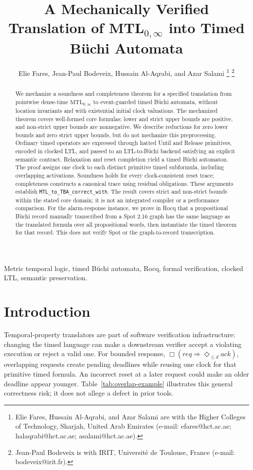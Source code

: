 \documentclass[10pt,journal,compsoc]{IEEEtran}
\title{A Mechanically Verified Translation of MTL$_{0,\infty}$ into Timed B\"uchi Automata}
\author{Elie Fares, Jean-Paul Bodeveix, Hussain Al-Aqrabi, and Azar Salami%
\thanks{Elie Fares, Hussain Al-Aqrabi, and Azar Salami are with the Higher Colleges of Technology, Sharjah, United Arab Emirates (e-mail: efares@hct.ac.ae; halaqrabi@hct.ac.ae; asalami@hct.ac.ae).}%
\thanks{Jean-Paul Bodeveix is with IRIT, Universit\'e de Toulouse, France (e-mail: bodeveix@irit.fr).}%
}
\begin{document}
\maketitle

\begin{abstract}
We mechanize a soundness and completeness theorem for a specified translation
from pointwise dense-time $\mathrm{MTL}_{0,\infty}$ to event-guarded timed
B\"uchi automata, without location invariants and with existential initial
clock valuations. The
mechanized theorem covers well-formed core formulas: lower and strict upper
bounds are positive, and non-strict upper bounds are nonnegative. We describe
reductions for zero lower bounds and zero strict upper bounds, but do not
mechanize this preprocessing. Ordinary timed operators are expressed through
hatted Until and Release primitives, encoded in clocked LTL, and passed to an
LTL-to-B\"uchi backend satisfying an explicit semantic contract. Relaxation
and reset completion yield a timed B\"uchi automaton. The proof assigns one
clock to each distinct primitive timed subformula, including overlapping
activations. Soundness holds for every clock-consistent reset trace;
completeness constructs a canonical trace using residual obligations. These
arguments establish \texttt{MTL\_\allowbreak{}to\_\allowbreak{}TBA\_\allowbreak{}correct\_\allowbreak{}with}. The result covers strict and non-strict
bounds within the stated core domain; it is not an integrated compiler or a
performance comparison. For the alarm-response instance, we prove in Rocq
that a propositional B\"uchi record manually transcribed from a Spot 2.16
graph has the same language as the translated formula over all propositional
words, then instantiate the timed theorem for that record. This does not
verify Spot or the graph-to-record transcription.
\end{abstract}

\begin{IEEEkeywords}
Metric temporal logic, timed B\"uchi automata, Rocq, formal verification,
clocked LTL, semantic preservation.
\end{IEEEkeywords}

\section{Introduction}
\label{sec:introduction}
Temporal-property translators are part of software verification
infrastructure: changing the timed language can make a downstream verifier
accept a violating execution or reject a valid one. For bounded response,
$\Box(\mathit{req}\Rightarrow\Diamond_{\le d}\mathit{ack})$, overlapping
requests create pending deadlines while reusing one clock for that primitive
timed formula. An incorrect reset at a later request could make an older
deadline appear younger. Table~\ref{tab:overlap-example} illustrates this
general correctness risk; it does not allege a defect in prior tools.
\end{document}
